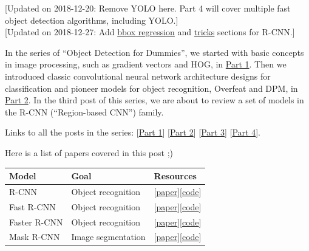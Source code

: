 {{[}Updated on 2018-12-20: Remove YOLO here. Part 4 will cover multiple fast object detection algorithms, including YOLO.{]}}\\
{{[}Updated on 2018-12-27: Add \hyperref[bounding-box-regression]{bbox regression} and \hyperref[common-tricks]{tricks} sections for R-CNN.{]}}

In the series of ``Object Detection for Dummies'', we started with basic concepts in image processing, such as gradient vectors and HOG, in \href{https://lilianweng.github.io/posts/2017-10-29-object-recognition-part-1/}{Part 1}. Then we introduced classic convolutional neural network architecture designs for classification and pioneer models for object recognition, Overfeat and DPM, in \href{https://lilianweng.github.io/posts/2017-12-15-object-recognition-part-2/}{Part 2}. In the third post of this series, we are about to review a set of models in the R-CNN (``Region-based CNN'') family.

Links to all the posts in the series: {[}\href{https://lilianweng.github.io/posts/2017-10-29-object-recognition-part-1/}{Part 1}{]} {[}\href{https://lilianweng.github.io/posts/2017-12-15-object-recognition-part-2/}{Part 2}{]} {[}\href{https://lilianweng.github.io/posts/2017-12-31-object-recognition-part-3/}{Part 3}{]} {[}\href{https://lilianweng.github.io/posts/2018-12-27-object-recognition-part-4/}{Part 4}{]}.

Here is a list of papers covered in this post ;)

\begin{longtable}[]{@{}lll@{}}
\toprule\noalign{}
\textbf{Model} & \textbf{Goal} & \textbf{Resources} \\
\midrule\noalign{}
\endhead
\bottomrule\noalign{}
\endlastfoot
R-CNN & Object recognition & {[}\href{https://arxiv.org/abs/1311.2524}{paper}{]}{[}\href{https://github.com/rbgirshick/rcnn}{code}{]} \\
Fast R-CNN & Object recognition & {[}\href{https://arxiv.org/abs/1504.08083}{paper}{]}{[}\href{https://github.com/rbgirshick/fast-rcnn}{code}{]} \\
Faster R-CNN & Object recognition & {[}\href{https://arxiv.org/abs/1506.01497}{paper}{]}{[}\href{https://github.com/rbgirshick/py-faster-rcnn}{code}{]} \\
Mask R-CNN & Image segmentation & {[}\href{https://arxiv.org/abs/1703.06870}{paper}{]}{[}\href{https://github.com/CharlesShang/FastMaskRCNN}{code}{]} \\
\end{longtable}

